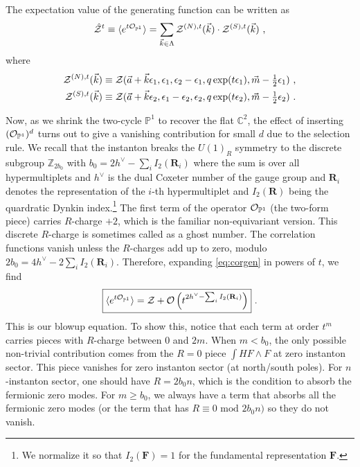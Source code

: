 \documentclass[letterpaper, 11pt]{article}
\def\IC{\mathbb{C}}
\def\IP{\mathbb{P}}
\def\IZ{\mathbb{Z}}
\def\CO{{\cal O}}
\def\CZ{{\cal Z}}
\def\e{\epsilon}
\begin{document}
The expectation value of the generating function can be written as
\begin{align} \label{eq:corgen}
  \hat{\CZ}^{t} \equiv \langle e^{t  {\CO}_{\IP^1}}\rangle = \sum_{\vec{k} \in \Lambda}  \CZ^{(N),t}(\vec{k}) \cdot \CZ^{(S),t}(\vec{k})\ ,  
\end{align}
where
\begin{align}
  \label{eq:param-np-sp}
\begin{split}
  \CZ^{(N),t}(\vec{k}) &\equiv \CZ(\vec{a}+\vec{k} \e_1, \e_1, \e_2-\e_1, q \exp(t \e_1), \vec{m} -\tfrac{1}{2}\e_1) \ , \\
  \CZ^{(S),t}(\vec{k}) &\equiv \CZ(\vec{a}+\vec{k} \e_2, \e_1 - \e_2, \e_2, q \exp(t \e_2), \vec{m} -\tfrac{1}{2}\e_2)\ . \\
\end{split}
\end{align}

Now, as we shrink the two-cycle $\IP^1$ to recover the flat $\IC^2$, the effect of inserting $({\CO}_{\IP^1})^d$ turns out to give a vanishing contribution for small $d$ due to the selection rule. We recall that the instanton breaks the $U(1)_R$ symmetry to the discrete subgroup $\IZ_{2b_0}$ with $b_0 = 2h^\vee - \sum_i I_2(\mathbf{R}_i)$ where the sum is over all hypermultiplets and $h^\vee$ is the dual Coxeter number of the gauge group and $\mathbf{R}_i$ denotes the representation of the $i$-th hypermultiplet and $I_2(\mathbf{R})$ being the quardratic Dynkin index.\footnote{We normalize it so that $I_2(\mathbf{F})= 1$ for the fundamental representation $\mathbf{F}$.} The first term of the operator ${\CO}_{\IP^1}$ (the two-form piece) carries $R$-charge $+2$, which is the familiar non-equivariant version. This discrete $R$-charge is sometimes called as a ghost number. The correlation functions vanish unless the $R$-charges add up to zero, modulo $2b_0 = 4h^\vee - 2\sum_i I_2(\mathbf{R}_i)$. 
Therefore, expanding \eqref{eq:corgen} in powers of $t$, we find
\begin{align}
  \label{eq:donaldson-4d}
  \boxed{  \langle e^{t {\CO}_{\IP^1}}\rangle = \CZ + \CO \left(t^{2h^\vee -  \sum_i I_2(\mathbf{R}_i)}\right) } \ . 
\end{align}
This is our blowup equation. 
To show this, notice that each term at order $t^m$ carries pieces with $R$-charge between $0$ and $2m$. When $m < b_0$, the only possible non-trivial contribution comes from the $R=0$ piece $ \int H F\wedge F$ at zero instanton sector.  This piece vanishes for zero instanton sector (at north/south poles). For $n$-instanton sector, one should have $R=2b_0 n$, which is the condition to absorb the fermionic zero modes. For $m \ge b_0$, we always have a term that absorbs all the fermionic zero modes (or the term that has $R \equiv 0 \textrm{ mod } 2b_0 n)$ so they do not vanish. 
\end{document}
